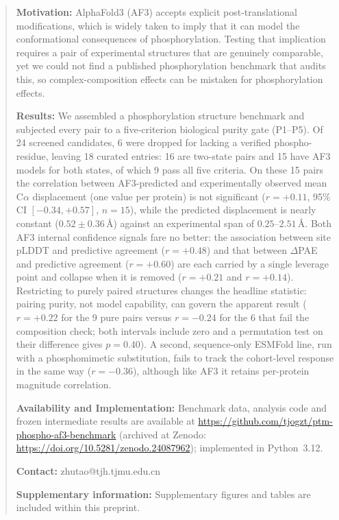\documentclass[11pt]{article}
\begin{document}
\begin{abstract}
\noindent
\textbf{Motivation:} AlphaFold3 (AF3) accepts explicit post-translational
modifications, which is widely taken to imply that it can model the
conformational consequences of phosphorylation. Testing that implication
requires a pair of experimental structures that are genuinely comparable,
yet we could not find a published phosphorylation benchmark that audits
this, so complex-composition effects can be mistaken for phosphorylation
effects.

\noindent
\textbf{Results:} We assembled a phosphorylation structure benchmark and
subjected every pair to a five-criterion biological purity gate
(P1--P5). Of 24 screened candidates, 6 were dropped for lacking a verified
phospho-residue, leaving 18 curated entries: 16 are two-state pairs and 15
have AF3 models for both states, of which 9 pass all five criteria. On
these 15 pairs the correlation between AF3-predicted and experimentally
observed mean C$\alpha$ displacement (one value per protein) is not
significant ($r=+0.11$, 95\% CI
$[-0.34,+0.57]$, $n=15$), while the predicted displacement is nearly
constant ($0.52\pm0.36$\,\AA) against an experimental span of
$0.25$--$2.51$\,\AA. Both AF3 internal confidence signals fare no better:
the association between site pLDDT and predictive agreement
($r=+0.48$) and that between $\Delta$PAE and predictive agreement
($r=+0.60$) are each carried by a single leverage point and collapse when
it is removed ($r=+0.21$ and $r=+0.14$). Restricting to purely paired
structures changes the headline statistic: pairing purity, not model
capability, can govern the apparent result ($r=+0.22$ for the 9
pure pairs versus $r=-0.24$ for the 6 that fail the
composition check; both intervals include zero and a permutation test on
their difference gives $p=0.40$). A second,
sequence-only ESMFold line, run with a phosphomimetic substitution, fails
to track the cohort-level response in the same way ($r=-0.36$), although
like AF3 it retains per-protein magnitude correlation.

\noindent
\textbf{Availability and Implementation:} Benchmark data, analysis code
and frozen intermediate results are available at
\url{https://github.com/tjogzt/ptm-phospho-af3-benchmark}
(archived at Zenodo: \url{https://doi.org/10.5281/zenodo.24087962});
implemented in Python~3.12.

\noindent
\textbf{Contact:} zhutao@tjh.tjmu.edu.cn

\noindent
\textbf{Supplementary information:} Supplementary figures and tables are
included within this preprint.
\end{abstract}
\end{document}
